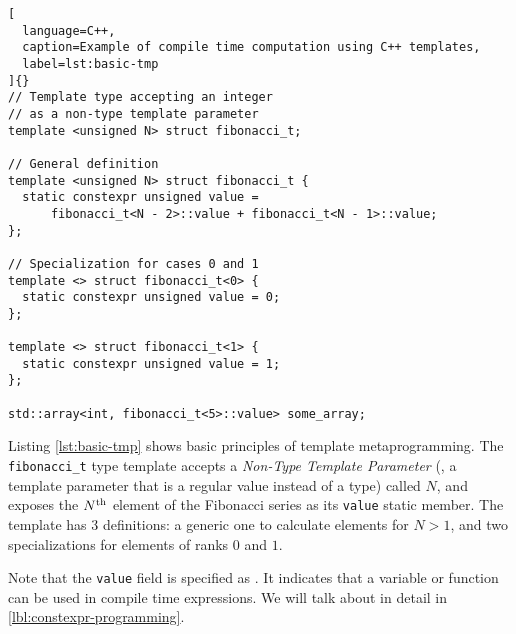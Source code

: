 \documentclass[../main]{subfiles}
\begin{document}
\begin{lstlisting}[
  language=C++,
  caption=Example of compile time computation using C++ templates,
  label=lst:basic-tmp
]{}
// Template type accepting an integer
// as a non-type template parameter
template <unsigned N> struct fibonacci_t;

// General definition
template <unsigned N> struct fibonacci_t {
  static constexpr unsigned value =
      fibonacci_t<N - 2>::value + fibonacci_t<N - 1>::value;
};

// Specialization for cases 0 and 1
template <> struct fibonacci_t<0> {
  static constexpr unsigned value = 0;
};

template <> struct fibonacci_t<1> {
  static constexpr unsigned value = 1;
};

std::array<int, fibonacci_t<5>::value> some_array;
\end{lstlisting}

Listing \ref{lst:basic-tmp} shows basic principles of \cpp template
metaprogramming. The \lstinline{fibonacci_t} type template accepts a
\textit{Non-Type Template Parameter} (\nttp, \ie a template parameter that is
a regular value instead of a type) called $N$, and exposes the
$N\textsuperscript{th}$ element of the Fibonacci series as its
\lstinline{value} static member. The template has 3 definitions:
a generic one to calculate elements for $N > 1$,
and two specializations for elements of ranks $0$ and $1$.

Note that the \lstinline{value} field is specified as \constexpr.
It indicates that a variable or function can be used in compile time
expressions.
We will talk about \constexpr in detail in \ref{lbl:constexpr-programming}.
\end{document}
